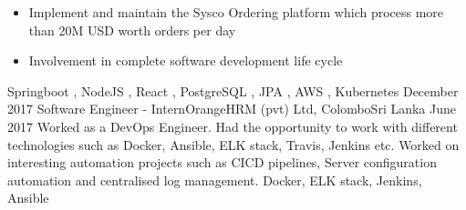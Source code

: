 \begin{experiences}
{                    \begin{itemize}
                       \item  Implement and maintain the Sysco Ordering platform which process more than
                            20M USD worth orders per day
                       \item Involvement in complete software development life cycle                      
                      \end{itemize}
                    }
                    {Springboot , NodeJS , React , PostgreSQL , JPA , AWS , Kubernetes}
  \emptySeparator
  \experience
    {December 2017}     {Software Engineer - Intern}{OrangeHRM (pvt) Ltd, Colombo}{Sri Lanka}
    {June 2017}    {
                     Worked as a DevOps Engineer. Had the opportunity to work with different technologies such as Docker, Ansible, ELK stack, Travis, Jenkins etc. Worked on interesting automation projects such as CICD pipelines, Server configuration automation and centralised log management.
                    }
                    { Docker, ELK stack, Jenkins, Ansible}

\end{experiences}
